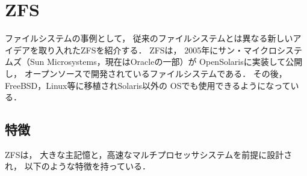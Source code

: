 \chapter{ZFS}
ファイルシステムの事例として，
従来のファイルシステムとは異なる新しいアイデアを取り入れたZFSを紹介する．
ZFSは，
2005年にサン・マイクロシステムズ（Sun Microsystems，現在はOracleの一部）が
OpenSolarisに実装して公開し，
オープンソースで開発されているファイルシステムである．
その後，FreeBSD，Linux等に移植されSolaris以外の
OSでも使用できるようになっている．

\section{特徴}
ZFSは，
大きな主記憶と，高速なマルチプロセッサシステムを前提に設計され，
以下のような特徴を持っている．

